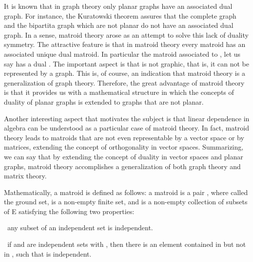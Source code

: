 \documentclass[a4paper,12pt]{article}
\begin{document}
It is known that in graph theory only planar graphs have an associated dual
graph. For instance, the Kuratowski theorem assures that the complete graph \coordHE{} and the bipartita graph \coordHE{} which are not planar do not have an
associated dual graph. In a sense, matroid theory arose as an attempt to
solve this lack of duality symmetry. The attractive feature is that in
matroid theory every matroid has an associated unique dual matroid. In
particular the matroid associated to \coordHE{}, let us say \coordHE{} has a
dual \coordHE{}. The important aspect is that \coordHE{} is
not graphic, that is, it can not be represented by a graph. This is, of
course, an indication that matroid theory is a generalization of graph
theory. Therefore, the great advantage of matroid theory is that it provides
us with a mathematical structure in which the concepts of duality of planar
graphs is extended to graphs that are not planar.

Another interesting aspect that motivates the subject is that linear
dependence in algebra can be understood as a particular case of matroid
theory. In fact, matroid theory leads to matroids that are not even
representable by a vector space or by matrices, extending the concept of
orthogonality in vector spaces. Summarizing, we can say that by extending
the concept of duality in vector spaces and planar graphs, matroid theory
accomplishes a generalization of both graph theory and matrix theory.

Mathematically, a matroid is defined as follows: a matroid \coordHE{} is a pair \coordHE{}, where \coordHE{} called the ground set, is a non-empty finite set, and \coordHE{}
is a non-empty collection of subsets of E satisfying the following two
properties:

\coordHE{}  \coordHE{}\textit{\ }any subset of an independent set is independent.

\coordHE{}\textit{\ }if \coordHE{} and \coordHE{} are independent sets with \coordHE{}  \coordHE{}, then there is an element \coordHE{} contained in \coordHE{} but not in \coordHE{}, such that \coordHE{} is independent.
\end{document}
